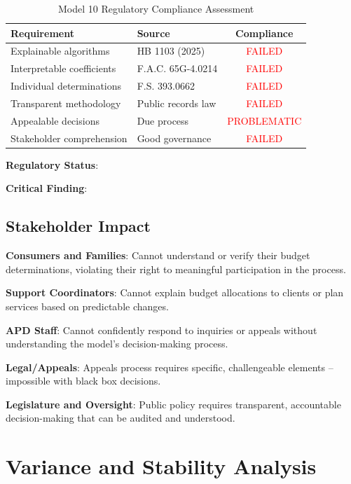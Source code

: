 \begin{table}[h]
\centering
\caption{Model 10 Regulatory Compliance Assessment}
\begin{tabular}{llc}
\toprule
\textbf{Requirement} & \textbf{Source} & \textbf{Compliance} \\
\midrule
Explainable algorithms & HB 1103 (2025) & \textcolor{red}{FAILED} \\
Interpretable coefficients & F.A.C. 65G-4.0214 & \textcolor{red}{FAILED} \\
Individual determinations & F.S. 393.0662 & \textcolor{red}{FAILED} \\
Transparent methodology & Public records law & \textcolor{red}{FAILED} \\
Appealable decisions & Due process & \textcolor{red}{PROBLEMATIC} \\
Stakeholder comprehension & Good governance & \textcolor{red}{FAILED} \\
\bottomrule
\end{tabular}
\end{table}

\textbf{Regulatory Status}: \ModelTenRegulatoryCompliant{}

\textbf{Critical Finding}: \ModelTenBlackBoxWarning{}

\subsection{Stakeholder Impact}

\textbf{Consumers and Families}: Cannot understand or verify their budget determinations, violating their right to meaningful participation in the process.

\textbf{Support Coordinators}: Cannot explain budget allocations to clients or plan services based on predictable changes.

\textbf{APD Staff}: Cannot confidently respond to inquiries or appeals without understanding the model's decision-making process.

\textbf{Legal/Appeals}: Appeals process requires specific, challengeable elements -- impossible with black box decisions.

\textbf{Legislature and Oversight}: Public policy requires transparent, accountable decision-making that can be audited and understood.

\section{Variance and Stability Analysis}

